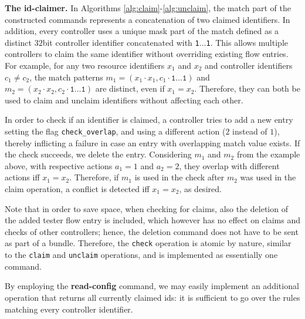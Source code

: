 \documentclass[conference]{sigcomm-alternate}
\newcommand{\concat}[0]{\cdot}
\newcommand{\claimcheck}{check\xspace}
\newcommand{\checko}{\texttt{check\_overlap}\xspace}
\begin{document}
\vspace{1mm}
\noindent\textbf{The id-claimer.}
%
In Algorithms \ref{alg:claim}-\ref{alg:unclaim},
the match part of the constructed commands represents a concatenation
of two claimed identifiers.
In addition, every controller uses a unique mask part of the match
defined as a distinct $32$bit controller identifier concatenated with
\texttt{1$\ldots$1}.
This allows multiple controllers to claim the same identifier without
overriding existing flow entries.
%
For example, for any two resource identifiers $x_1$ and $x_2$ and controller identifiers $c_1\neq c_2$,
the match patterns $m_1=(x_1\concat x_1, c_1\concat \texttt{1$\ldots$1})$ and $ m_2=(x_2\concat x_2, c_2\concat \texttt{1$\ldots$1})$ are distinct,
even if $x_1=x_2$.
Therefore, they can both be used to claim and unclaim identifiers without affecting each other.

In order to check if an identifier is claimed, a controller tries to add
a new entry setting the flag \texttt{\checko}, and using a different
action ($2$ instead of $1$),
thereby inflicting a failure in case an entry with overlapping match value exists.
If the check succeeds, we delete the entry.
Considering $m_1$ and $m_2$ from the example above,
with respective actions $a_1=1$ and $a_2=2$,  they overlap
with different actions iff $x_1=x_2$. Therefore, if $m_1$ is used in the \claimcheck after $m_2$ was used in the claim operation,
a conflict is detected iff $x_1=x_2$, as desired.

Note that in order to save space, when checking for claims, also the deletion of the added tester flow entry is included,
which however has no effect on claims and checks of other controllers; hence, the deletion command does not
have to be sent as part of a bundle. Therefore, the \texttt{\claimcheck} operation is atomic by nature,
similar to the \texttt{claim} and \texttt{unclaim} operations, and is
implemented as essentially one command.

By employing the \textbf{read-config} command, we may easily implement
an additional operation that returns all currently claimed ids: it is
sufficient to go over the rules matching every controller identifier.

\end{document}
